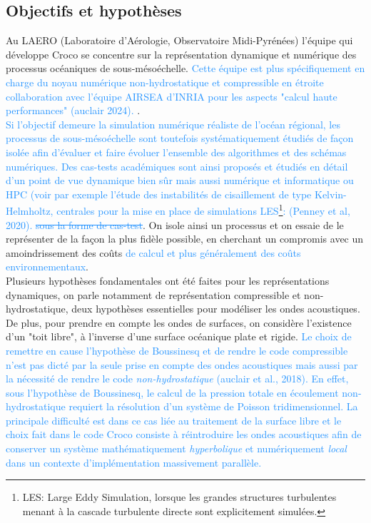 \documentclass{rapportECC}
\newcommand{\FAadd}[1]{\textcolor{DodgerBlue}{{#1}}}                     %
\newcommand{\FAdel}[1]{\textcolor{DodgerBlue}{\sout{#1}}}                %
\begin{document}
\subsection{Objectifs et hypothèses}
Au LAERO (Laboratoire d'Aérologie, Observatoire Midi-Pyrénées) l'équipe qui développe Croco se concentre sur la représentation dynamique et numérique des processus océaniques de sous-mésoéchelle. \FAadd{Cette équipe est plus spécifiquement en charge du noyau numérique non-hydrostatique et compressible en étroite collaboration avec l'équipe AIRSEA d'INRIA pour les aspects "calcul haute performances" (auclair 2024). }.\\
\FAadd{Si l'objectif demeure la simulation numérique réaliste de l'océan régional, les processus de sous-mésoéchelle sont toutefois systématiquement étudiés de façon isolée afin d'évaluer et faire évoluer l'ensemble des algorithmes et des schémas numériques. Des cas-tests académiques sont ainsi proposés et étudiés en détail d'un point de vue dynamique bien sûr mais aussi numérique et informatique ou HPC (voir par exemple l'étude des instabilités de cisaillement de type Kelvin-Helmholtz, centrales pour la mise en place de simulations LES\footnote{LES: Large Eddy Simulation, lorsque les grandes structures turbulentes menant à la cascade turbulente directe sont explicitement simulées.}: (Penney et al, 2020).}
\FAdel{sous la forme de cas-test}. On isole ainsi un processus et on essaie de le représenter de la façon la plus fidèle possible, en cherchant un compromis avec un amoindrissement des coûts \FAadd{de calcul et plus généralement des coûts environnementaux}. \\
Plusieurs hypothèses fondamentales ont été faites pour les représentations dynamiques, on parle notamment de représentation compressible et non-hydrostatique, deux hypothèses essentielles pour modéliser les ondes acoustiques. De plus, pour prendre en compte les ondes de surfaces, on considère l'existence d'un "toit libre", à l'inverse d'une surface océanique plate et rigide. \FAadd{Le choix de remettre en cause l'hypothèse de Boussinesq et de rendre le code compressible n'est pas dicté par la seule prise en compte des ondes acoustiques mais aussi par la nécessité de rendre le code \textit{non-hydrostatique} (auclair et al., 2018). En effet, sous l'hypothèse de Boussinesq, le calcul de la pression totale en écoulement non-hydrostatique requiert la résolution d'un système de Poisson tridimensionnel. La principale difficulté est dans ce cas liée au traitement de la surface libre et le choix fait dans le code Croco consiste à réintroduire les ondes acoustiques afin de conserver un système mathématiquement \textit{hyperbolique} et numériquement \textit{local} dans un contexte d'implémentation massivement parallèle.}
\end{document}
